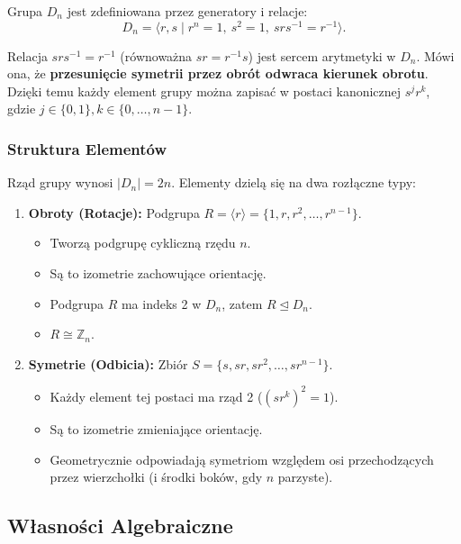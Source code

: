 \begin{theorem}
Grupa $D_n$ jest zdefiniowana przez generatory i relacje:
\[ D_n = \langle r, s \mid r^n = 1, \ s^2 = 1, \ srs^{-1} = r^{-1} \rangle. \]
\end{theorem}

\begin{remark}
Relacja $srs^{-1} = r^{-1}$ (równoważna $sr = r^{-1}s$) jest sercem arytmetyki w $D_n$. Mówi ona, że \textbf{przesunięcie symetrii przez obrót odwraca kierunek obrotu}.
Dzięki temu każdy element grupy można zapisać w postaci kanonicznej $s^j r^k$, gdzie $j \in \{0,1\}, k \in \{0, \dots, n-1\}$.
\end{remark}

\subsubsection{Struktura Elementów}

Rząd grupy wynosi $|D_n| = 2n$. Elementy dzielą się na dwa rozłączne typy:

\begin{enumerate}
    \item \textbf{Obroty (Rotacje):} Podgrupa $R = \langle r \rangle = \{1, r, r^2, \dots, r^{n-1}\}$.
    \begin{itemize}
        \item Tworzą podgrupę cykliczną rzędu $n$.
        \item Są to izometrie zachowujące orientację.
        \item Podgrupa $R$ ma indeks 2 w $D_n$, zatem $R \unlhd D_n$.
        \item $R \cong \mathbb{Z}_n$.
    \end{itemize}
    
    \item \textbf{Symetrie (Odbicia):} Zbiór $S = \{s, sr, sr^2, \dots, sr^{n-1}\}$.
    \begin{itemize}
        \item Każdy element tej postaci ma rząd 2 ($(sr^k)^2 = 1$).
        \item Są to izometrie zmieniające orientację.
        \item Geometrycznie odpowiadają symetriom względem osi przechodzących przez wierzchołki (i środki boków, gdy $n$ parzyste).
    \end{itemize}
\end{enumerate}

\subsection{Własności Algebraiczne}

